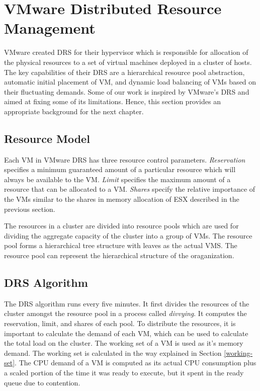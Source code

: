 \section{VMware Distributed Resource Management}
VMware created DRS \cite{gulati2012vmware} for their hypervisor which is responsible for allocation of the physical resources to a set of virtual machines deployed in a cluster of hosts. The key capabilities of their DRS are a hierarchical resource pool abstraction, automatic initial placement of VM, and dynamic load balancing of VMs based on their fluctuating demands. Some of our work is inspired by VMware's DRS and aimed at fixing some of its limitations. Hence, this section provides an appropriate background for the next chapter.

\subsection{Resource Model}
Each VM in VMware DRS has three resource control parameters. \textit{Reservation} specifies a minimum guaranteed amount of a particular resource which will always be available to the VM. \textit{Limit} specifies the maximum amount of a resource that can be allocated to a VM. \textit{Shares} specify the relative importance of the VMs similar to the shares in memory allocation of ESX described in the previous section.

The resources in a cluster are divided into resource pools which are used for dividing the aggregate capacity of the cluster into a group of VMs. The resource pool forms a  hierarchical tree structure with leaves as the actual VMS. The resource pool can represent the hierarchical structure of the oraganization.

\subsection{DRS Algorithm}
The DRS algorithm runs every five minutes. It first divides the resources of the cluster amongst the resource pool in a process called \textit{divvying}. It computes the reservation, limit, and shares of each pool. To distribute the resources, it is important to calculate the demand of each VM, which can be used to calculate the total load on the cluster. The working set of a VM is used as it's memory demand. The working set is calculated in the way explained in Section \ref{working-set}. The CPU demand of a VM is computed as its actual CPU consumption plus a scaled portion of the  time it was ready to execute, but it spent in the ready queue due to contention.

